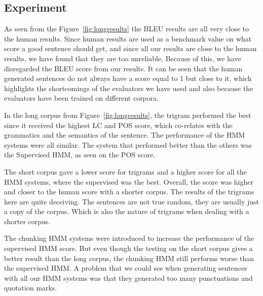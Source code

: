\documentclass[a4paper,12pt]{article}
\begin{document}
\subsection{Experiment}

As seen from the Figure~\ref{fig:longresults} the BLEU results are all very
close to the human results. Since human results are used as a benchmark value on 
what score a good sentence should get, and since all our results are close to
the human results, we have found that they are too unreliable. Because of
this, we have disregarded the BLEU score from our results.
It can be seen that the human generated sentences do not always have a score 
equal to 1 but close to it, which highlights the shortcomings of the evaluators we
have used and also because the evaluators have been trained on different corpora.

In the long corpus from Figure~\ref{fig:longresults}, the trigram performed 
the best since it received the highest LC and POS score, which co-relates with the
grammatics and the semantics of the sentence. The performance of the 
HMM systems were all similar. The system that performed better than the 
others was the Supervised HMM, as seen on the POS score.

The short corpus gave a lower score for trigrams and a higher score for all the 
HMM systems, where the supervised was the best. Overall, the score was 
higher and closer to the human score with a shorter corpus.
The results of the trigrams here are quite deceiving. The sentences are 
not true random, they are usually just a copy of the corpus. Which is also the 
nature of trigrams when dealing with a shorter corpus.

The chunking HMM systems were introduced to increase the performance of the
supervised HMM score. But even though the testing on the short corpus gives a
better result than the long corpus, the chunking HMM still performs worse than
the supervised HMM.
A problem that we could see when generating sentences with all our HMM systems
was that they generated too many punctuations and quotation marks.
\end{document}
